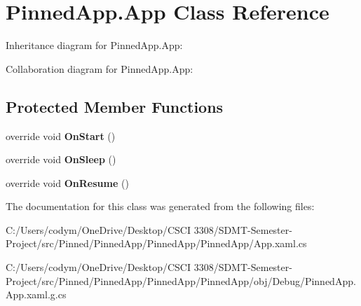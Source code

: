 \hypertarget{class_pinned_app_1_1_app}{}\section{Pinned\+App.\+App Class Reference}
\label{class_pinned_app_1_1_app}


Inheritance diagram for Pinned\+App.\+App\+:


Collaboration diagram for Pinned\+App.\+App\+:
\subsection*{Protected Member Functions}
\begin{DoxyCompactItemize}
\item 
\mbox{\label{class_pinned_app_1_1_app_a28cfe068bf03125babaaa70f8c067bcf}} 
override void {\bfseries On\+Start} ()
\item 
\mbox{\label{class_pinned_app_1_1_app_a0eb3b8c34667deef43eb75b6354c1dbb}} 
override void {\bfseries On\+Sleep} ()
\item 
\mbox{\label{class_pinned_app_1_1_app_ad51f93e32fc83bbcb00e168fde10d697}} 
override void {\bfseries On\+Resume} ()
\end{DoxyCompactItemize}


The documentation for this class was generated from the following files\+:\begin{DoxyCompactItemize}
\item 
C\+:/\+Users/codym/\+One\+Drive/\+Desktop/\+C\+S\+C\+I 3308/\+S\+D\+M\+T-\/\+Semester-\/\+Project/src/\+Pinned/\+Pinned\+App/\+Pinned\+App/\+Pinned\+App/App.\+xaml.\+cs\item 
C\+:/\+Users/codym/\+One\+Drive/\+Desktop/\+C\+S\+C\+I 3308/\+S\+D\+M\+T-\/\+Semester-\/\+Project/src/\+Pinned/\+Pinned\+App/\+Pinned\+App/\+Pinned\+App/obj/\+Debug/Pinned\+App.\+App.\+xaml.\+g.\+cs\end{DoxyCompactItemize}
